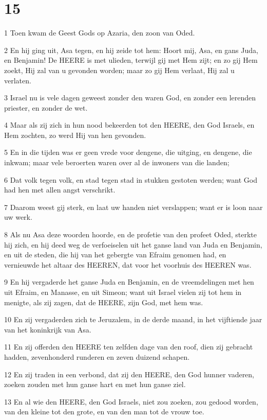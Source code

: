 \chapter{15}

\par 1 Toen kwam de Geest Gods op Azaria, den zoon van Oded.
\par 2 En hij ging uit, Asa tegen, en hij zeide tot hem: Hoort mij, Asa, en gans Juda, en Benjamin! De HEERE is met ulieden, terwijl gij met Hem zijt; en zo gij Hem zoekt, Hij zal van u gevonden worden; maar zo gij Hem verlaat, Hij zal u verlaten.
\par 3 Israel nu is vele dagen geweest zonder den waren God, en zonder een lerenden priester, en zonder de wet.
\par 4 Maar als zij zich in hun nood bekeerden tot den HEERE, den God Israels, en Hem zochten, zo werd Hij van hen gevonden.
\par 5 En in die tijden was er geen vrede voor dengene, die uitging, en dengene, die inkwam; maar vele beroerten waren over al de inwoners van die landen;
\par 6 Dat volk tegen volk, en stad tegen stad in stukken gestoten werden; want God had hen met allen angst verschrikt.
\par 7 Daarom weest gij sterk, en laat uw handen niet verslappen; want er is loon naar uw werk.
\par 8 Als nu Asa deze woorden hoorde, en de profetie van den profeet Oded, sterkte hij zich, en hij deed weg de verfoeiselen uit het ganse land van Juda en Benjamin, en uit de steden, die hij van het gebergte van Efraim genomen had, en vernieuwde het altaar des HEEREN, dat voor het voorhuis des HEEREN was.
\par 9 En hij vergaderde het ganse Juda en Benjamin, en de vreemdelingen met hen uit Efraim, en Manasse, en uit Simeon; want uit Israel vielen zij tot hem in menigte, als zij zagen, dat de HEERE, zijn God, met hem was.
\par 10 En zij vergaderden zich te Jeruzalem, in de derde maand, in het vijftiende jaar van het koninkrijk van Asa.
\par 11 En zij offerden den HEERE ten zelfden dage van den roof, dien zij gebracht hadden, zevenhonderd runderen en zeven duizend schapen.
\par 12 En zij traden in een verbond, dat zij den HEERE, den God hunner vaderen, zoeken zouden met hun ganse hart en met hun ganse ziel.
\par 13 En al wie den HEERE, den God Israels, niet zou zoeken, zou gedood worden, van den kleine tot den grote, en van den man tot de vrouw toe.
